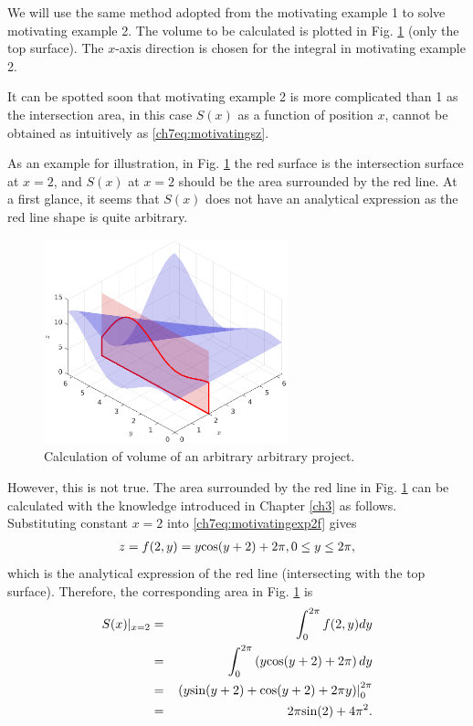 We will use the same method adopted from the motivating example 1 to solve motivating example 2. The volume to be calculated is plotted in Fig. \ref{ch7fig:motivatingexp2} (only the top surface). The $x$-axis direction is chosen for the integral in motivating example 2.

It can be spotted soon that motivating example 2 is more complicated than 1 as the intersection area, in this case $S(x)$ as a function of position $x$, cannot be obtained as intuitively as \eqref{ch7eq:motivatingsz}.

As an example for illustration, in Fig. \ref{ch7fig:motivatingexp2} the red surface is the intersection surface at $x=2$, and $S(x)$ at $x=2$ should be the area surrounded by the red line. At a first glance, it seems that $S(x)$ does not have an analytical expression as the red line shape is quite arbitrary.

\begin{figure}
	\centering
	\includegraphics[width=200pt]{chapters/chapter7/figures/motivatingexp2.eps}
	\caption{Calculation of volume of an arbitrary arbitrary project.} \label{ch7fig:motivatingexp2}
\end{figure}

However, this is not true. The area surrounded by the red line in Fig. \ref{ch7fig:motivatingexp2} can be calculated with the knowledge introduced in Chapter \ref{ch3} as follows. Substituting constant $x=2$ into \eqref{ch7eq:motivatingexp2f} gives
\begin{eqnarray}
	z = f(2,y) = y\textup{cos}(y+2) + 2\pi, 0\leq y\leq2\pi, \nonumber
\end{eqnarray}
which is the analytical expression of the red line (intersecting with the top surface). Therefore, the corresponding area in Fig. \ref{ch7fig:motivatingexp2} is
\begin{eqnarray}
	S(x)|_{x=2} &=& \int_{0}^{2\pi} f(2,y) dy \nonumber \\ &=& \int_{0}^{2\pi}\left(y\textup{cos}(y+2) + 2\pi\right)dy \nonumber \\
	&=& \left.\left(y\textup{sin}(y+2)+\textup{cos}(y+2) + 2\pi y\right)\right|_{0}^{2\pi} \nonumber \\
	&=& 2\pi\textup{sin}(2) + 4\pi^2. \nonumber
\end{eqnarray}

